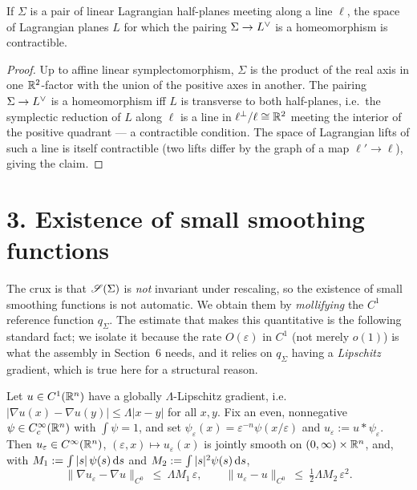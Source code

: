 \begin{qeightlemma}\label{lem:edge}
If $\Sigma$ is a pair of linear Lagrangian half-planes meeting along a line
$\ell$, the space of Lagrangian planes $L$ for which the pairing
$\Sigma\to L^{\vee}$ is a homeomorphism is contractible.
\end{qeightlemma}

\begin{proof}
Up to affine linear symplectomorphism, $\Sigma$ is the product of the real axis
in one $\mathbb{R}^2$-factor with the union of the positive axes in another. The pairing
$\Sigma\to L^{\vee}$ is a homeomorphism iff $L$ is transverse to both half-planes,
i.e.\ the symplectic reduction of $L$ along $\ell$ is a line in $\ell^\perp/\ell\cong\mathbb{R}^2$
meeting the interior of the positive quadrant — a contractible condition. The
space of Lagrangian lifts of such a line is itself contractible (two lifts differ
by the graph of a map $\ell'\to\ell$), giving the claim.
\end{proof}

\section*{3. Existence of small smoothing functions}

The crux is that $\mathscr S(\Sigma)$ is \emph{not} invariant under rescaling, so the
existence of small smoothing functions is not automatic. We obtain them by
\emph{mollifying} the $C^1$ reference function $q_\Sigma$. The estimate that makes
this quantitative is the following standard fact; we isolate it because the rate
$O(\varepsilon)$ in $C^1$ (not merely $o(1)$) is what the assembly in Section~6
needs, and it relies on $q_\Sigma$ having a \emph{Lipschitz} gradient, which is
true here for a structural reason.

\begin{qeightlemma}\label{lem:moll}
Let $u\in C^1(\mathbb{R}^n)$ have a globally $\Lambda$-Lipschitz gradient, i.e.
$|\nabla u(x)-\nabla u(y)|\le\Lambda|x-y|$ for all $x,y$. Fix an even, nonnegative
$\psi\in C^\infty_c(\mathbb{R}^n)$ with $\int\psi=1$, and set
$\psi_\varepsilon(x)=\varepsilon^{-n}\psi(x/\varepsilon)$ and
$u_\varepsilon:=u*\psi_\varepsilon$. Then $u_\varepsilon\in C^\infty(\mathbb{R}^n)$,
$(\varepsilon,x)\mapsto u_\varepsilon(x)$ is jointly smooth on $(0,\infty)\times\mathbb{R}^n$,
and, with $M_1:=\int|s|\,\psi(s)\,\mathrm d s$ and $M_2:=\int|s|^2\psi(s)\,\mathrm d s$,
\[
\|\nabla u_\varepsilon-\nabla u\|_{C^0}\ \le\ \Lambda M_1\,\varepsilon,
\qquad
\|u_\varepsilon-u\|_{C^0}\ \le\ \tfrac12\Lambda M_2\,\varepsilon^2 .
\]
\end{qeightlemma}

